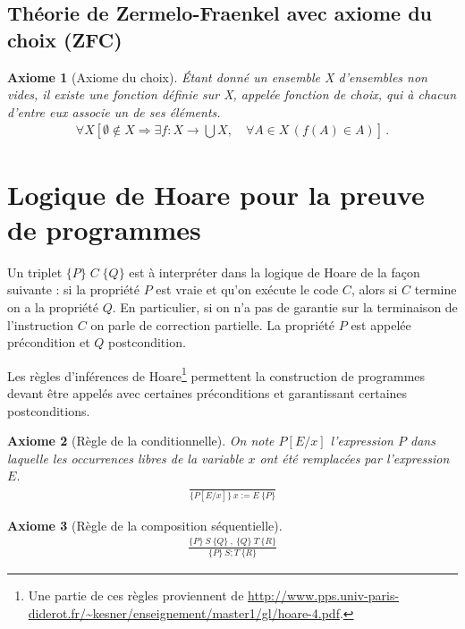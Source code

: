 \documentclass[10pt,a4paper]{article}
\newtheorem{axiom}{Axiome}[section]
\begin{document}
\subsection{Théorie de Zermelo-Fraenkel avec axiome du choix (ZFC)}

\begin{axiom}[Axiome du choix] Étant donné un ensemble X d'ensembles non vides, il existe une fonction définie sur X, appelée fonction de choix, qui à chacun d'entre eux associe un de ses éléments.
\begin{align}
\forall X \left[ \emptyset \notin X \Rightarrow \exists f: X \rightarrow \bigcup X, \quad \forall A \in X \, ( f(A) \in A ) \right] \,. 
\end{align}
\end{axiom}

\section{Logique de Hoare pour la preuve de programmes}

Un triplet $ \{P\}\;C\;\{Q\} $ est à interpréter dans la logique de Hoare de la façon suivante : si la propriété $P$ est vraie et qu'on exécute le code $C$, alors si $C$ termine on a la propriété $Q$. En particulier, si on n'a pas de garantie sur la terminaison de l'instruction $C$ on parle de correction partielle. La propriété $P$ est appelée précondition et $Q$ postcondition.

Les règles d'inférences de Hoare\footnote{Une partie de ces règles proviennent de \url{http://www.pps.univ-paris-diderot.fr/~kesner/enseignement/master1/gl/hoare-4.pdf}.} permettent la construction de programmes devant être appelés avec certaines préconditions et garantissant certaines postconditions.

\begin{axiom}[Règle de la conditionnelle]
On note $ P[E/x]$ l'expression $P$ dans laquelle les occurrences libres de la variable $x$ ont été remplacées par l'expression $E$.
\begin{align}
\frac{}{\{P[E/x]\}\ x:=E \ \{P\} }
\end{align}
\end{axiom}

\begin{axiom}[Règle de la composition séquentielle]
\begin{align}
\frac {\{P\}\ S\ \{Q\}\ , \ \{Q\}\ T\ \{R\} } {\{P\}\ S;T\ \{R\}}
\end{align}
\end{axiom}
\end{document}
